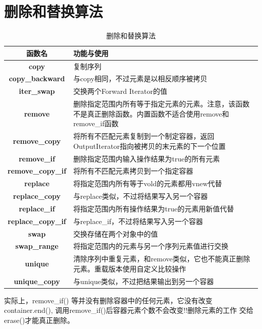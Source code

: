 \documentclass[UTF8,a4paper,12pt]{ctexbook}
\begin{document}
	\section{删除和替换算法}
	\begin{table}[H]
		\centering
		\caption{删除和替换算法}
		\begin{tabular}{c|m{13cm}}
			\hline 
			函数名 & 功能与使用\\
			\hline
			\textbf{copy}	& 复制序列\\
			\hline 
			\textbf{copy\_backward}  & 与copy相同，不过元素是以相反顺序被拷贝\\
			\hline 
			\textbf{iter\_swap}  & 交换两个Forward Iterator的值\\
			\hline 
			\textbf{remove}  & 删除指定范围内所有等于指定元素的元素。注意，该函数不是真正删除函数。内置函数不适合使用remove和remove\_if函数\\
			\hline 
			\textbf{remove\_copy}  & 将所有不匹配元素复制到一个制定容器，返回OutputIterator指向被拷贝的末元素的下一个位置\\
			\hline 
			\textbf{remove\_if}	& 删除指定范围内输入操作结果为true的所有元素\\
			\hline 
			\textbf{remove\_copy\_if}	& 将所有不匹配元素拷贝到一个指定容器\\
			\hline 
			\textbf{replace}	& 将指定范围内所有等于vold的元素都用vnew代替\\
			\hline 
			\textbf{replace\_copy}	&与replace类似，不过将结果写入另一个容器\\
			\hline 
			\textbf{replace\_if}	&将指定范围内所有操作结果为true的元素用新值代替\\
			\hline 
			\textbf{replace\_copy\_if}	&与replace\_if，不过将结果写入另一个容器	\\
			\hline 
			\textbf{swap}	& 交换存储在两个对象中的值\\
			\hline 
			\textbf{swap\_range}	& 将指定范围内的元素与另一个序列元素值进行交换\\
			\hline
			\textbf{unique}	& 清除序列中重复元素，和remove类似，它也不能真正删除元素。重载版本使用自定义比较操作\\
			\hline
			\textbf{unique\_copy}	& 与unique类似，不过把结果输出到另一个容器\\
			\hline
		\end{tabular}
	\end{table}
	 实际上，remove\_if() 等并没有删除容器中的任何元素，它没有改变container.end(), 调用remove\_if()后容器元素个数不会改变!!删除元素的工作
	 交给erase()才能真正删除。
	 
\end{document}
